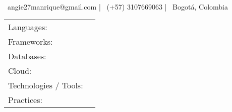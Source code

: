 \documentclass[]{awesome-cv}
\begin{document}
    
\begin{center}
	  \\
	\vspace{2mm}
	{\hspace{0.8cm}\faEnvelope\ angie27manrique@gmail.com}  |  {\faMobile\ (+57) 3107669063}  |  {\faMapMarker\ Bogotá, Colombia} 
\end{center}

\begin{cventries}
	\cventry
	{}
	{\def\arraystretch{1.15}{\begin{tabular}{ l l }
		Languages:  & {\skill{ Java, C\#, TypeScript, SQL, Python (Beginner).}} \\
		Frameworks:  & {\skill{ Spring, Angular.}} \\
		Databases:  & {\skill{ PostgreSQL, MySQL, SQLServer, MongoDB.}} \\
		Cloud:  & {\skill{ AWS, Azure.}} \\
		Technologies / Tools: \hspace{0.05cm} & {\skill{ Docker, Jenkins, GraphQL, Kafka, SonarQube, Maven, npm, Git.}} \\
		Practices:  & {\skill{ Agile, Scrum, SOLID Principles, Test-Driven Development, Code Reviews.}} \\
		\end{tabular}}}
	{}
	{}
	{}
\end{cventries}
\vspace{-7mm}
\end{document}
